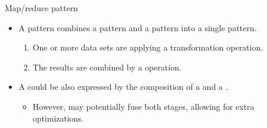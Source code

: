 \begin{frame}[t]{Map/reduce pattern}
\begin{itemize}
  \item A  pattern combines a  pattern and
        a  pattern into a single pattern.
    \begin{enumerate}
      \item One or more data sets are  applying a transformation operation.
      \item The results are combined by a  operation.
    \end{enumerate}
  \vfill
  \item A  could be also expressed by the composition of a
         and a . 
    \begin{itemize}
      \item However,  may potentially fuse both stages, 
            allowing for extra optimizations.
    \end{itemize}
\end{itemize}
\end{frame}

